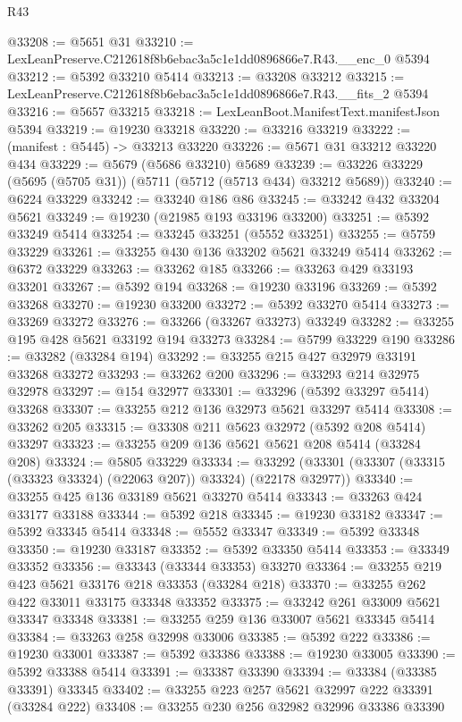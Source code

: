 \begin{lexlean}{R43}
\begin{coremodule}
@33208 := @5651 @31
@33210 := LexLeanPreserve.C212618f8b6ebac3a5c1e1dd0896866e7.R43.__enc_0 @5394
@33212 := @5392 @33210 @5414
@33213 := @33208 @33212
@33215 := LexLeanPreserve.C212618f8b6ebac3a5c1e1dd0896866e7.R43.__fits_2 @5394
@33216 := @5657 @33215
@33218 := LexLeanBoot.ManifestText.manifestJson @5394
@33219 := @19230 @33218
@33220 := @33216 @33219
@33222 := (manifest : @5445) -> @33213 @33220
@33226 := @5671 @31 @33212 @33220 @434
@33229 := @5679 (@5686 @33210) @5689
@33239 := @33226 @33229 (@5695 (@5705 @31)) (@5711 (@5712 (@5713 @434) @33212 @5689))
@33240 := @6224 @33229
@33242 := @33240 @186 @86
@33245 := @33242 @432 @33204 @5621
@33249 := @19230 (@21985 @193 @33196 @33200)
@33251 := @5392 @33249 @5414
@33254 := @33245 @33251 (@5552 @33251)
@33255 := @5759 @33229
@33261 := @33255 @430 @136 @33202 @5621 @33249 @5414
@33262 := @6372 @33229
@33263 := @33262 @185
@33266 := @33263 @429 @33193 @33201
@33267 := @5392 @194
@33268 := @19230 @33196
@33269 := @5392 @33268
@33270 := @19230 @33200
@33272 := @5392 @33270 @5414
@33273 := @33269 @33272
@33276 := @33266 (@33267 @33273) @33249
@33282 := @33255 @195 @428 @5621 @33192 @194 @33273
@33284 := @5799 @33229 @190
@33286 := @33282 (@33284 @194)
@33292 := @33255 @215 @427 @32979 @33191 @33268 @33272
@33293 := @33262 @200
@33296 := @33293 @214 @32975 @32978
@33297 := @154 @32977
@33301 := @33296 (@5392 @33297 @5414) @33268
@33307 := @33255 @212 @136 @32973 @5621 @33297 @5414
@33308 := @33262 @205
@33315 := @33308 @211 @5623 @32972 (@5392 @208 @5414) @33297
@33323 := @33255 @209 @136 @5621 @5621 @208 @5414 (@33284 @208)
@33324 := @5805 @33229
@33334 := @33292 (@33301 (@33307 (@33315 (@33323 @33324) (@22063 @207)) @33324) (@22178 @32977))
@33340 := @33255 @425 @136 @33189 @5621 @33270 @5414
@33343 := @33263 @424 @33177 @33188
@33344 := @5392 @218
@33345 := @19230 @33182
@33347 := @5392 @33345 @5414
@33348 := @5552 @33347
@33349 := @5392 @33348
@33350 := @19230 @33187
@33352 := @5392 @33350 @5414
@33353 := @33349 @33352
@33356 := @33343 (@33344 @33353) @33270
@33364 := @33255 @219 @423 @5621 @33176 @218 @33353 (@33284 @218)
@33370 := @33255 @262 @422 @33011 @33175 @33348 @33352
@33375 := @33242 @261 @33009 @5621 @33347 @33348
@33381 := @33255 @259 @136 @33007 @5621 @33345 @5414
@33384 := @33263 @258 @32998 @33006
@33385 := @5392 @222
@33386 := @19230 @33001
@33387 := @5392 @33386
@33388 := @19230 @33005
@33390 := @5392 @33388 @5414
@33391 := @33387 @33390
@33394 := @33384 (@33385 @33391) @33345
@33402 := @33255 @223 @257 @5621 @32997 @222 @33391 (@33284 @222)
@33408 := @33255 @230 @256 @32982 @32996 @33386 @33390

\end{coremodule}
\end{lexlean}
